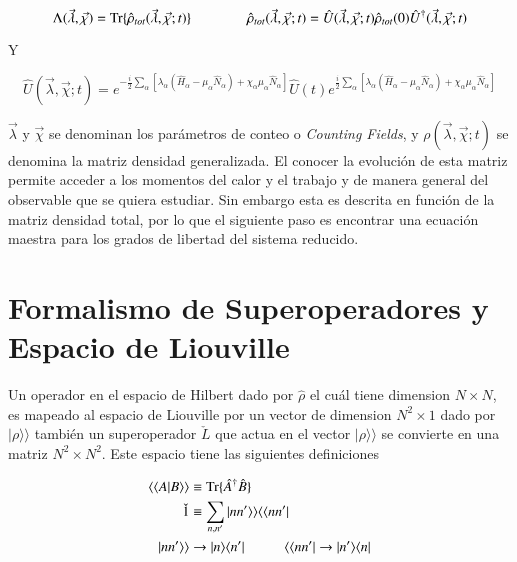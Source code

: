 \begin{equation}
    \Lambda(\vec{\lambda},\vec{\chi}) = \text{Tr}\{\hat{\rho}_{tot}(\vec{\lambda},\vec{\chi};t) \}    \hspace{14mm} \hat{\rho}_{tot}(\vec{\lambda},\vec{\chi};t) = \hat{U}(\vec{\lambda},\vec{\chi};t) \hat{\rho}_{tot}(0) \hat{U}^{\dagger}(\vec{\lambda},\vec{\chi};t)
    \label{sec2:evolucionconteo}
\end{equation}

Y 

\begin{equation*}
    \hat{U}(\vec{\lambda},\vec{\chi};t) = e^{-\frac{i}{2}\sum_{\alpha}[\lambda_{\alpha}(\hat{H}_{\alpha} - \mu_{\alpha}\hat{N}_{\alpha} ) + \chi_{\alpha}\mu_{\alpha}\hat{N}_{\alpha} ]  } \hat{U}(t) e^{\frac{i}{2}\sum_{\alpha}[ \lambda_{\alpha}(\hat{H}_{\alpha} - \mu_{\alpha}\hat{N}_{\alpha}) + \chi_{\alpha}\mu_{\alpha}\hat{N}_{\alpha} ]}
\end{equation*}

$\vec{\lambda}$ y $\vec{\chi}$ se denominan los parámetros de conteo o \textit{Counting Fields}, y $\rho(\vec{\lambda},\vec{\chi};t)$ se denomina la matriz densidad generalizada. El conocer la evolución de esta matriz permite acceder a los momentos del calor y el trabajo y de manera general del observable que se quiera estudiar. Sin embargo esta es descrita en función de la matriz densidad total, por lo que el siguiente paso es encontrar una ecuación maestra para los grados de libertad del sistema reducido.

\label{sec2:estadistica2puntos}



\section{Formalismo de Superoperadores y Espacio de Liouville}
Un operador en el espacio de Hilbert dado por $\hat{\rho}$ el cuál tiene dimension $N\times N$, es mapeado al espacio de Liouville por un vector de dimension $N^{2}\times 1$ dado por $|\rho \rangle \rangle$  también un superoperador $\check{L}$ que actua en el vector $|\rho\rangle \rangle$ se convierte en una matriz $N^{2}\times N^{2}$. Este espacio tiene las siguientes definiciones

\begin{align*}
    \langle \langle A|B\rangle \rangle  &\equiv \text{Tr}\{\hat{A}^{\dagger}\hat{B}\} \\
   \check{1}  &\equiv \sum_{n,n'}|nn'\rangle \rangle \langle \langle nn'| \\
     |nn'\rangle \rangle &  \to |n\rangle \langle n'|  \hspace{10mm}  \langle \langle nn'| \to |n'\rangle \langle n|     
\end{align*}

